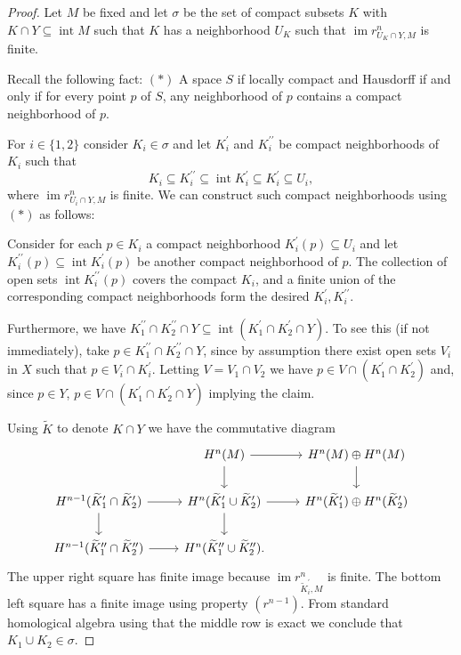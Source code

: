 \documentclass{amsart}
\newcommand{\dprime}{{\prime\prime}}
\DeclareMathOperator{\im}{im}
\DeclareMathOperator{\interior}{int}
\begin{document}
	\begin{proof}
		Let $M$ be fixed and let $\sigma$ be the set of compact subsets $K$ with $K \cap Y \subseteq \interior M$ such that $K$ has a neighborhood $U_K$ such that $\im r^n_{U_K \cap Y, M}$ is finite.
		
		Recall the following fact:
		$(\ast)$ A space $S$ if locally compact and Hausdorff if and only if for every point $p$ of $S$, any neighborhood of $p$ contains a compact neighborhood of $p$.
		
		For $i \in \{1, 2\}$ consider $K_i \in \sigma$ and let $K_i^\prime$ and $K_i^\dprime$ be compact neighborhoods of $K_i$ such that
		\begin{equation*}
		K_i \subseteq K_i^\dprime \subseteq \interior K_i^\prime \subseteq K_i^\prime \subseteq U_i,
		\end{equation*}
		where $\im r^n_{U_i \cap Y, M}$ is finite. 
		We can construct such compact neighborhoods using $(\ast)$ as follows:
		
		Consider for each $p \in K_i$ a compact neighborhood $K^\prime_i(p) \subseteq U_i$ and let $K_i^\dprime(p) \subseteq \interior K_i^\prime(p)$ be another compact neighborhood of $p$. The collection of open sets $\interior K_i^\dprime(p)$ covers the compact $K_i$, and a finite union of the corresponding compact neighborhoods form the desired $K_i^\prime, K_i^\dprime$.
		
		Furthermore, we have $K^\dprime_1 \cap K^\dprime_2 \cap Y \subseteq \interior(K_1^\prime \cap K_2^\prime \cap Y)$. To see this (if not immediately), take $p \in K^\dprime_1 \cap K^\dprime_2 \cap Y$, since by assumption there exist open sets $V_i$ in $X$ such that $p \in V_i \cap K_i^\prime$. Letting $V = V_1 \cap V_2$ we have $p \in V \cap (K^\prime_1 \cap K^\prime_2)$ and, since $p \in Y$, $p \in V \cap (K^\prime_1 \cap K^\prime_2 \cap Y)$ implying the claim.
		
		Using $\widetilde{K}$ to denote $K \cap Y$ we have the commutative diagram
		\begin{equation*}
		\begin{tikzcd}
		& \arrow[r] \arrow[d] H^n(M) & H^n(M) \oplus H^n(M) \arrow[d] \\
		H^{n-1}(\widetilde K_1^\prime \cap \widetilde K_2^\prime) \arrow[r] \arrow[d] & 
		H^{n}(\widetilde K_1^\prime \cup \widetilde K_2^\prime) \arrow[r] \arrow[d] &
		H^{n}(\widetilde K_1^\prime) \oplus H^n(\widetilde K_2^\prime) \\
		H^{n-1}(\widetilde K_1^\dprime \cap \widetilde K_2^\dprime) \arrow[r] & 
		H^{n}(\widetilde K_1^\dprime \cup \widetilde K_2^\dprime). &
		\end{tikzcd}
		\end{equation*}
		The upper right square has finite image because $\im r^n_{\widetilde K^\prime_i, M}$ is finite. The bottom left square has a finite image using property $(r^{n-1})$. From standard homological algebra using that the middle row is exact we conclude that $K_1 \cup K_2 \in \sigma$.
		

\end{proof}
\end{document}
